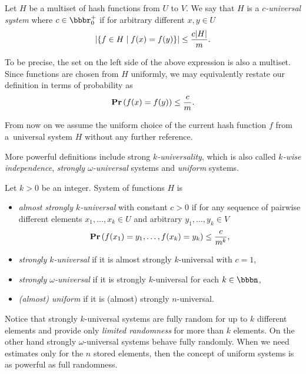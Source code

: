 \begin{definition}
\label{definition-c-universal-system}
Let $H$ be a multiset of hash functions from $U$ to $V$. We say that $H$ is a \emph{$c$-universal system} where $c \in \bbbr_0^+$ if for arbitrary different $x, y \in U$
\[
\left|\lbrace f \in H \mid f(x) = f(y) \rbrace\right| \leq \frac{c|H|}{m}.
\]
\end{definition}

To be precise, the set on the left side of the above expression is also a multiset. Since functions are chosen from $H$ uniformly, we may equivalently restate our definition in terms of probability as
\[
\mathbf{Pr}\left(f(x) = f(y)\right) \leq \frac{c}{m}.
\]

From now on we assume the uniform choice of the current hash function $f$ from a~universal system $H$ without any further reference.

More powerful definitions include strong \emph{$k$-universality}, which is also called \emph{$k$-wise independence}, \emph{strongly $\omega$-universal} systems and \emph{uniform} systems.
\begin{definition}
Let $k > 0$ be an integer. System of functions $H$ is
\begin{itemize}
	\item \emph{almost strongly $k$-universal} with constant $c > 0$ if for any sequence of pairwise different elements $x_1, \dots, x_k \in U$ and arbitrary $y_1, \dots, y_k \in V$ \[\mathbf{Pr}\left(f(x_1) = y_1, \dots, f(x_k) = y_k\right) \leq \frac{c}{m^k}\mbox{,}\]
	\item \emph{strongly $k$-universal} \cite{DBLP:conf/focs/WegmanC79} if it is almost strongly $k$-universal with $c = 1$,
	\item \emph{strongly $\omega$-universal} \cite{DBLP:conf/focs/WegmanC79} if it is strongly $k$-universal for each $k \in \bbbn$,
	\item \emph{(almost) uniform} \cite{DBLP:journals/siamcomp/PaghP08} if it is (almost) strongly $n$-universal.
\end{itemize}
\end{definition}

Notice that strongly $k$-universal systems are fully random for up to $k$ different elements and provide only \emph{limited randomness} for more than $k$ elements. On the other hand strongly $\omega$-universal systems behave fully randomly. When we need estimates only for the $n$ stored elements, then the concept of uniform systems is as powerful as full randomness.

